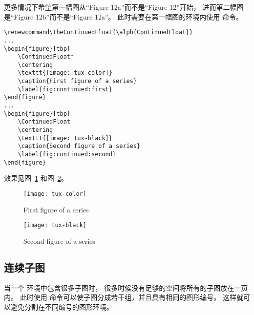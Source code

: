 更多情况下希望第一幅图从“Figure 12a”而不是“Figure 12”开始，
进而第二幅图是“Figure 12b”而不是“Figure 12a”。
此时需要在第一幅图的环境内使用  命令。
\begin{lstlisting}
\renewcommand\theContinuedFloat{\alph{ContinuedFloat}}
...
\begin{figure}[tbp]
	\ContinuedFloat*
	\centering
	\texttt{[image: tux-color]}
	\caption{First figure of a series}
	\label{fig:continued:first}
\end{figure}
...
\begin{figure}[tbp]
	\ContinuedFloat
	\centering
	\texttt{[image: tux-black]}
	\caption{Second figure of a series}
	\label{fig:continued:second}
\end{figure}
\end{lstlisting}
效果见图~\ref{fig:continued:first} 和图~\ref{fig:continued:second}。

\begin{figure}[tbp]
	\ContinuedFloat*
	\centering
	\texttt{[image: tux-color]}
	\caption{First figure of a series}
	\label{fig:continued:first}
\end{figure}

\begin{figure}[tbp]
	\ContinuedFloat
	\centering
	\texttt{[image: tux-black]}
	\caption{Second figure of a series}
	\label{fig:continued:second}
\end{figure}

\subsection{连续子图}

当一个  环境中包含很多子图时，
很多时候没有足够的空间将所有的子图放在一页内。
此时使用  命令可以使子图分成若干组，并且具有相同的图形编号。
这样就可以避免分割在不同编号的图形环境。


